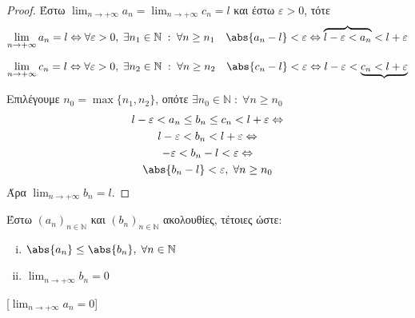 \documentclass[main.tex]{subfiles}
\begin{document}
\begin{proof}
\item {}
  Έστω $ \lim_{n \to +\infty} a_{n} = \lim_{n \to +\infty} c_{n} = l $ και 
  έστω $ \varepsilon >0 $, τότε
  \[ \lim_{n \to +\infty} a_{n} = l \Leftrightarrow \forall 
    \varepsilon >0, \; \exists n_{1} \in \mathbb{N} \; : \; \forall n 
    \geq n_{1} \quad \abs{a_{n} - l} < \varepsilon \Leftrightarrow 
  \overbrace{l - \varepsilon < a_{n}} < l + \varepsilon \] 

  \[ \lim_{n \to +\infty} c_{n} = l \Leftrightarrow \forall 
    \varepsilon >0, \; \exists n_{2} 
    \in \mathbb{N} \; : \; \forall n \geq n_{2} \quad \abs{c_{n} - l} 
    < \varepsilon \Leftrightarrow 
  l - \varepsilon < \underbrace{c_{n} < l + \varepsilon} \]

  Επιλέγουμε $ n_{0} = \max \{ n_{1}, n_{2} \} $, οπότε 
  $ \exists n_{0} \in \mathbb{N} \; : \; 
  \forall n \geq n_{0} $
  \begin{gather*}
    l - \varepsilon < a_{n} \leq b_{n} \leq c_{n} < l + 
    \varepsilon \Leftrightarrow \\
    l - \varepsilon < b_{n} < l + \varepsilon \Leftrightarrow \\
    - \varepsilon < b_{n} - l < \varepsilon \Leftrightarrow \\
    \abs{b_{n}-l} < \varepsilon, \; \forall n \geq n_{0}
  \end{gather*}
  Άρα $ \lim_{n \to +\infty} b_{n} = l $.
\end{proof}

\begin{cor}
  Έστω $ (a_{n})_{n \in \mathbb{N}} $ και $ 
  (b_{n})_{n \in \mathbb{N}} $ ακολουθίες, τέτοιες ώστε: 

  \vspace{\baselineskip}

  \begin{minipage}{0.25\textwidth}
    \begin{enumerate}[i)]
      \item $ \abs{a_{n}} \leq \abs{b_{n}}, \; \forall n \in 
        \mathbb{N} $ \hfill {}
      \item $ \lim_{n \to +\infty} b_{n} = 0$ \hfill {}
    \end{enumerate}
  \end{minipage}

  [$ \lim_{n \to +\infty} a_{n} = 0 $]
\end{cor}

\end{document}
